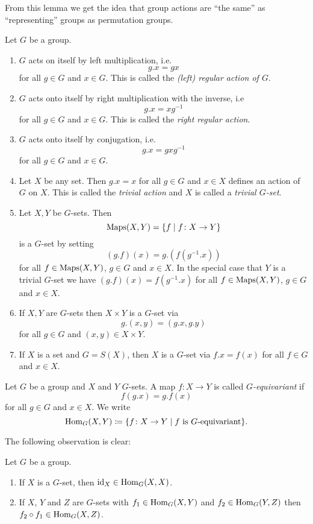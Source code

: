 From this lemma we get the idea that group actions are ``the same'' as ``representing'' groups as permutation groups.


\begin{expls}
 Let $G$ be a group.
 \begin{enumerate}[label=\emph{\alph*)},leftmargin=*]
  \item
   $G$ acts on itself by left multiplication, i.e.
   \[
    g.x = gx
   \]
   for all $g \in G$ and $x \in G$. This is called the \emph{(left) regular action of $G$}.
  \item
   $G$ acts onto itself by right multiplication with the inverse, i.e
   \[
    g.x = xg^{-1}
   \]
   for all $g \in G$ and $x \in G$. This is called the \emph{right regular action}.
  \item
   $G$ acts onto itself by conjugation, i.e.
   \[
    g.x = gxg^{-1}
   \]
   for all $g \in G$ and $x \in G$.
  \item
   Let $X$ be any set. Then $g.x = x$ for all $g \in G$ and $x \in X$ defines an action of $G$ on $X$. This is called the \emph{trivial action} and $X$ is called a \emph{trivial $G$-set}.
  \item
   Let $X, Y$ be $G$-sets. Then
   \[
    \operatorname{Maps}(X,Y) = \{f \mid f \colon X \to Y\}
   \]
   is a $G$-set by setting
   \[
    (g.f)(x) = g.\left(f\left(g^{-1}.x\right)\right)
   \]
   for all $f \in \operatorname{Maps}(X,Y)$, $g \in G$ and $x \in X$. In the special case that $Y$ is a trivial $G$-set we have $(g.f)(x) = f(g^{-1}.x)$ for all $f \in \operatorname{Maps}(X,Y)$, $g \in G$ and $x \in X$.
  \item
   If $X, Y$ are $G$-sets then $X \times Y$ is a $G$-set via
   \[
    g.(x,y) = (g.x,g.y)
   \]
   for all $g \in G$ and $(x,y) \in X \times Y$.
  \item
   If $X$ is a set and $G = S(X)$, then $X$ is a $G$-set via $f.x = f(x)$ for all $f \in G$ and $x \in X$.
 \end{enumerate}
\end{expls}


\begin{defi}
 Let $G$ be a group and $X$ and $Y$ $G$-sets. A map $f \colon X \to Y$ is called \emph{$G$-equivariant} if
 \[
  f(g.x) = g.f(x)
 \]
 for all $g \in G$ and $x \in X$. We write
 \[
  \operatorname{Hom}_G(X,Y) \coloneqq \{f \colon X \to Y \mid f \text{ is $G$-equivariant}\}.
 \]
\end{defi}


The following observation is clear:


\begin{lem}
 Let $G$ be a group.
 \begin{enumerate}[label=\emph{\alph*)},leftmargin=*]
  \item
   If $X$ is a $G$-set, then $\operatorname{id}_X \in \operatorname{Hom}_G(X,X)$.
  \item
   If $X$, $Y$ and $Z$ are $G$-sets with $f_1 \in \operatorname{Hom}_G(X,Y)$ and $f_2 \in \operatorname{Hom}_G(Y,Z)$ then $f_2 \circ f_1 \in \operatorname{Hom}_G(X,Z)$.
 \end{enumerate}
\end{lem}


